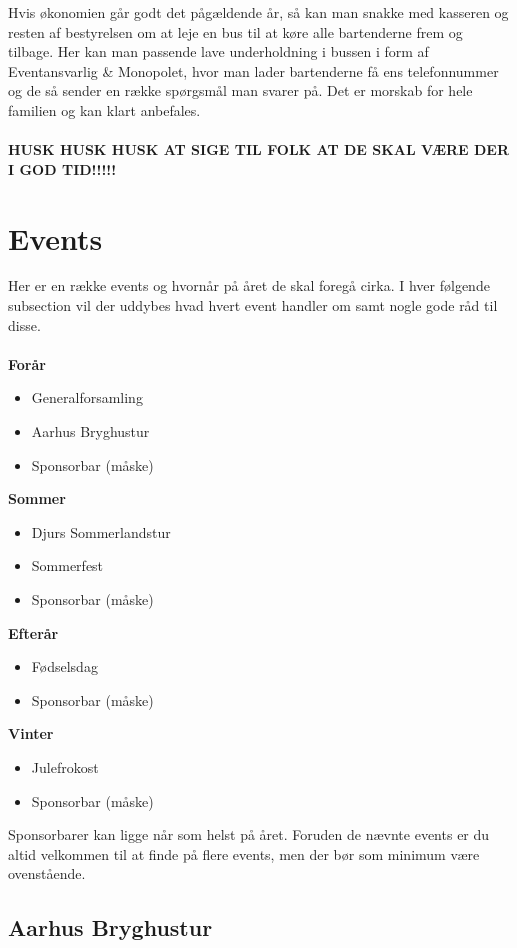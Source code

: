 Hvis økonomien går godt det pågældende år, så kan man snakke med kasseren og resten af bestyrelsen om at leje en bus til at køre alle bartenderne frem og tilbage. Her kan man passende lave underholdning i bussen i form af Eventansvarlig \& Monopolet, hvor man lader bartenderne få ens telefonnummer og de så sender en række spørgsmål man svarer på. Det er morskab for hele familien og kan klart anbefales.
\\ \\
\textbf{HUSK HUSK HUSK AT SIGE TIL FOLK AT DE SKAL VÆRE DER I GOD TID!!!!!}

\section*{Events}
\label{sec:arskalender}
Her er en række events og hvornår på året de skal foregå cirka. I hver følgende subsection vil der uddybes hvad hvert event handler om samt nogle gode råd til disse. \\ \\
\textbf{Forår}
  \begin{itemize}
  \item Generalforsamling
  \item Aarhus Bryghustur
  \item Sponsorbar (måske)
  \end{itemize}
\textbf{Sommer}
  \begin{itemize}
  \item Djurs Sommerlandstur
  \item Sommerfest
  \item Sponsorbar (måske)    
  \end{itemize}
\textbf{Efterår}
  \begin{itemize}
  \item Fødselsdag
  \item Sponsorbar (måske)
  \end{itemize}
\textbf{Vinter}
  \begin{itemize}
  \item Julefrokost
  \item Sponsorbar (måske)
  \end{itemize}
  
\noindent Sponsorbarer kan ligge når som helst på året. Foruden de nævnte events er du altid velkommen til at finde på flere events, men der bør som minimum være ovenstående.

\subsection*{Aarhus Bryghustur}
\label{sec:aarhus-bryghus}

